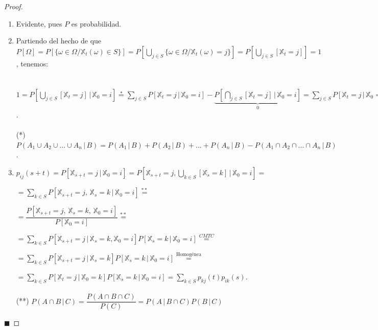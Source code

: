 \documentclass[12pt,a4paper]{article}
\newcommand*{\qed}{\hfill\ensuremath{\blacksquare}}
\begin{document}
\begin{proof}
\begin{enumerate}
\item Evidente, pues $P$ es probabilidad.
\item Partiendo del hecho de que $P[\Omega]=P\left[\{\omega\in\Omega/\mathbb{X}_t(\omega)\in S\}\right]=P\left[\bigcup\limits_{j\in S}\{\omega\in\Omega/\mathbb{X}_t(\omega)=j\}\right]=P\left[\bigcup\limits_{j\in S}[\mathbb{X}_t=j]\right]=1$, tenemos:
\\\\\\
$1=P\left[\bigcup\limits_{j\in S}[\mathbb{X}_t=j]\, | \,\mathbb{X}_0=i\right]\overset{*}{=}\sum\limits_{j\in S}P\left[\mathbb{X}_t=j\, | \,\mathbb{X}_0=i\right]-\underbrace{P\left[\bigcap\limits_{j\in S}[\mathbb{X}_t=j]\, | \,\mathbb{X}_0=i \right]}_{0}=\sum\limits_{j\in S}P\left[\mathbb{X}_t=j\, | \,\mathbb{X}_0=i\right]=\sum\limits_{j\in S}p_{ij}(t)$.
\\\\

(*) $P(A_1\cup A_2\cup ... \cup A_n\, |\, B)=P(A_1\, |\,B)+P(A_2\, |\,B)+...+P(A_n\, |\,B)-P(A_1\cap A_2\cap ... \cap A_n\, |\, B)$.
\item $p_{ij}(s+t)=P\left[\mathbb{X}_{s+t}=j\, | \,\mathbb{X}_0=i\right]=P\left[\mathbb{X}_{s+t}=j, \bigcup\limits_{k\in S}[\mathbb{X}_s=k]\, | \,\mathbb{X}_0=i\right]=$

$=\sum\limits_{k\in S}P\left[\mathbb{X}_{s+t}=j,\,\mathbb{X}_s=k\, | \,\mathbb{X}_0=i\right]\overset{**}{=}$

$=\dfrac{P[\mathbb{X}_{s+t}=j,\,\mathbb{X}_s=k,\,\mathbb{X}_0=i]}{P[\mathbb{X}_0=i]}\overset{**}{=}$

$=\sum\limits_{k\in S}P\left[\mathbb{X}_{s+t}=j\, | \,\mathbb{X}_s=k, \mathbb{X}_0=i\right]P\left[\mathbb{X}_s=k\, | \,\mathbb{X}_0=i\right]\overset{CMTC}{=}$

$=\sum\limits_{k\in S}P\left[\mathbb{X}_{s+t}=j\, | \,\mathbb{X}_s=k\right]P\left[\mathbb{X}_s=k\, | \,\mathbb{X}_0=i\right]\overset{\text{Homogénea}}{=}$

$=\sum\limits_{k\in S}P\left[\mathbb{X}_t=j\, | \,\mathbb{X}_0=k\right]P\left[\mathbb{X}_s=k\, | \,\mathbb{X}_0=i\right]=\sum\limits_{k\in S}p_{kj}(t)p_{ik}(s)$.
\\\\

(**) $P(A\cap B\, | \, C)=\dfrac{P(A\cap B\cap C)}{P(C)}=P(A\, | \, B\cap C)P(B\, | \,C)$ \\
\end{enumerate}
\qed
\end{proof}
\end{document}
